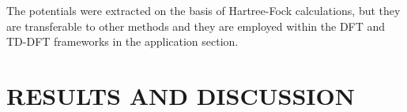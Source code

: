 \documentclass[12pt]{article}
\begin{document}
The potentials were extracted on the basis of Hartree-Fock calculations, but they are transferable
to other methods and they are employed within the DFT and TD-DFT frameworks in the application section.

\section*{\sffamily \Large RESULTS AND DISCUSSION}



%
%

%
\end{document}
